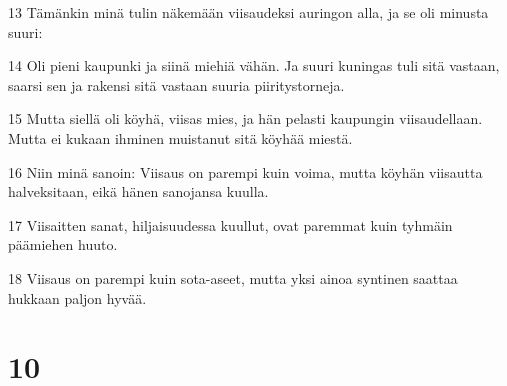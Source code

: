 \par 13 Tämänkin minä tulin näkemään viisaudeksi auringon alla, ja se oli minusta suuri:
\par 14 Oli pieni kaupunki ja siinä miehiä vähän. Ja suuri kuningas tuli sitä vastaan, saarsi sen ja rakensi sitä vastaan suuria piiritystorneja.
\par 15 Mutta siellä oli köyhä, viisas mies, ja hän pelasti kaupungin viisaudellaan. Mutta ei kukaan ihminen muistanut sitä köyhää miestä.
\par 16 Niin minä sanoin: Viisaus on parempi kuin voima, mutta köyhän viisautta halveksitaan, eikä hänen sanojansa kuulla.
\par 17 Viisaitten sanat, hiljaisuudessa kuullut, ovat paremmat kuin tyhmäin päämiehen huuto.
\par 18 Viisaus on parempi kuin sota-aseet, mutta yksi ainoa syntinen saattaa hukkaan paljon hyvää.

\chapter{10}


